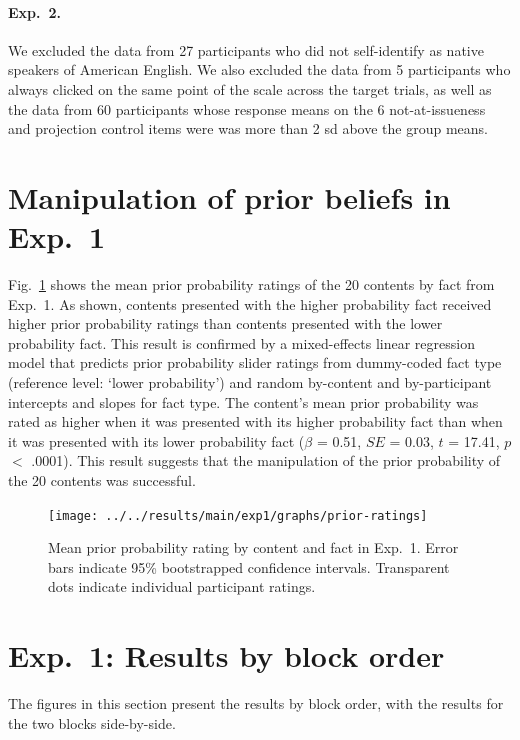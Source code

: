 \documentclass[11pt,fleqn]{article}
\newcommand{\figref}[1]{Fig.~\ref{#1}}
\newcommand{\6}{\mbox{$[\hspace*{-.6mm}[$}}
\newcommand{\9}{\mbox{$]\hspace*{-.6mm}]$}}
\begin{document}
\paragraph{Exp.~2.} We excluded the data from 27 participants who did not self-identify as native speakers of American English. We also excluded the data from 5 participants who always clicked on the same point of the scale across the target trials, as well as the data from 60 participants whose response means on the 6 not-at-issueness and projection control items were was more than 2 sd above the group means. 


\section{Manipulation of prior beliefs in Exp.~1}\label{a-beliefs-exp1}

\figref{f-prior} shows the mean prior probability ratings of the 20 contents by fact from Exp.~1. As shown, contents presented with the higher probability fact received higher prior probability ratings than contents presented with the lower probability fact. This result is confirmed by a mixed-effects linear regression model that predicts prior probability slider ratings from dummy-coded fact type (reference level: `lower probability') and random by-content and by-participant intercepts and slopes for fact type.  The content's mean prior probability was rated as higher when it was presented with its higher probability fact than when it was presented with its lower probability fact ($\beta$ = 0.51, $SE$ = 0.03, $t$ = 17.41, $p$ $<$ .0001). This result suggests that the manipulation of the prior probability of the 20 contents was successful.

\begin{figure}[h!]
\centering
\texttt{[image: ../../results/main/exp1/graphs/prior-ratings]}

\caption{Mean prior probability rating by content and fact in Exp.~1. Error bars indicate 95\% bootstrapped confidence intervals. Transparent dots indicate individual participant ratings.} 
\label{f-prior}
\end{figure}

\newpage

\section{Exp.~1: Results by block order}

The figures in this section present the results by block order, with the results for the two blocks side-by-side.
\end{document}
